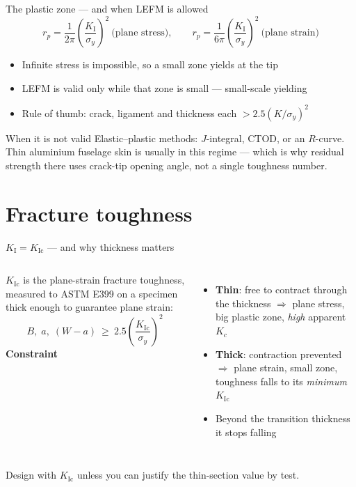 \documentclass[aspectratio=169,10pt]{beamer}
\begin{document}
\begin{frame}{The plastic zone --- and when LEFM is allowed}
\[
r_p=\frac{1}{2\pi}\left(\frac{K_{\mathrm I}}{\sigma_y}\right)^{2}\ \text{(plane stress)},\qquad
r_p=\frac{1}{6\pi}\left(\frac{K_{\mathrm I}}{\sigma_y}\right)^{2}\ \text{(plane strain)}
\]
\begin{itemize}
  \item Infinite stress is impossible, so a small zone yields at the tip
  \item LEFM is valid only while that zone is small --- \alert{small-scale yielding}
  \item Rule of thumb: crack, ligament and thickness each $>2.5(K/\sigma_y)^2$
\end{itemize}
\begin{block}{When it is not valid}
Elastic--plastic methods: $J$-integral, CTOD, or an $R$-curve. \alert{Thin aluminium fuselage skin is usually in this regime} --- which is why residual strength there uses crack-tip opening angle, not a single toughness number.
\end{block}
\end{frame}

\section{Fracture toughness}

\begin{frame}{$K_{\mathrm I}=K_{\mathrm{Ic}}$ --- and why thickness matters}
\begin{columns}[T]
$K_{\mathrm{Ic}}$ is the \alert{plane-strain} fracture toughness, measured to ASTM E399 on a specimen thick enough to guarantee plane strain:
\[
B,\;a,\;(W-a)\ \ge\ 2.5\left(\frac{K_{\mathrm{Ic}}}{\sigma_y}\right)^{2}
\]
\textbf{Constraint}
\begin{itemize}\footnotesize
  \item \textbf{Thin}: free to contract through the thickness $\Rightarrow$ plane stress, big plastic zone, \emph{high} apparent $K_c$
  \item \textbf{Thick}: contraction prevented $\Rightarrow$ plane strain, small zone, toughness falls to its \emph{minimum} $K_{\mathrm{Ic}}$
  \item Beyond the transition thickness it stops falling
\end{itemize}
\end{columns}
\vspace{4pt}
\begin{alertblock}{}
Design with $K_{\mathrm{Ic}}$ unless you can justify the thin-section value by test.
\end{alertblock}
\end{frame}
\end{document}
